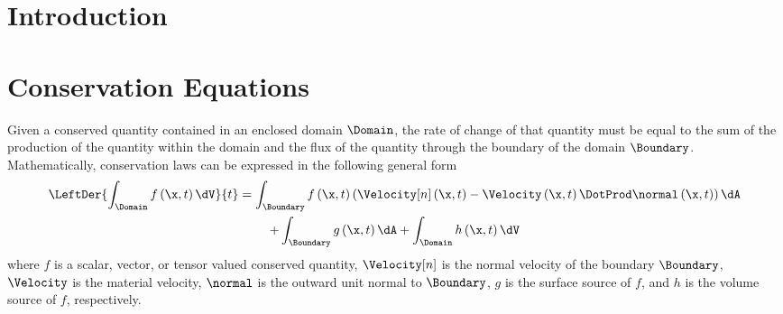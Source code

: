 \documentclass[10pt]{article}
\begin{document}
\section{Introduction}

\section{Conservation Equations}
\label{sec:cons.eq}
Given a conserved quantity contained in an enclosed domain $\Domain$, the rate
of change of that quantity must be equal to the sum of the production of the
quantity within the domain and the flux of the quantity through the boundary
of the domain $\Boundary$. Mathematically, conservation laws can be expressed in the following general form
%
%
\begin{multline}
  \label{eq:gen.cons.0}
  \LeftDer{\int_{\Domain}f\left(\x, t\right)\dV}{t} = {
    \int_{\Boundary}f\left(\x, t\right)\left(
      \Velocity[n]\left(\x, t\right) -
      \Velocity\left(\x, t\right)\DotProd\normal\left(\x, t\right)
    \right)\dA
  }\\
  + \int_{\Boundary}g\left(\x, t\right)\dA + \int_{\Domain}h\left(\x, t\right)\dV
\end{multline}
%
where %
$f$ is a scalar, vector, or tensor valued conserved quantity, %
$\Velocity[n]$ is the normal velocity of the boundary $\Boundary$, %
$\Velocity$ is the material velocity, %
$\normal$ is the outward unit normal to $\Boundary$, %
$g$ is the surface source of $f$, and %
$h$ is the volume source of $f$, respectively.%
%
%
\end{document}
